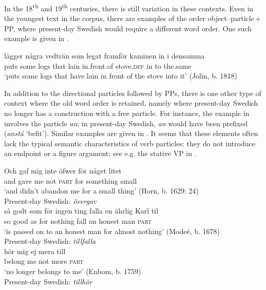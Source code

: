 \documentclass[output=paper]{langscibook}
\begin{document}
\begin{sloppypar}
In the 18\textsuperscript{th} and 19\textsuperscript{th} centuries, there is still variation in these contexts. Even in the youngest text in the corpus, there are examples of the order object–particle\,+\,PP, where present-day Swedish would require a different word order. One such example is given in .
\end{sloppypar}

\ea\label{ex:lalu:44}
\gll  lägger   några   vedträn   som   legat   framför       kaminen in       i     densamma\\
puts       some     logs     that     lain     in.front.of   stove.\textsc{def} in   to   the.same\\
\glt `puts some logs that have lain in front of the stove into it’ (Jolin, b. 1818)\\
\z


In addition to the directional particles followed by PPs, there is one other type of context where the old word order is retained, namely where present-day Swedish no longer has a construction with a free particle. For instance, the example in  involves the particle \textit{an}; in present-day Swedish, \textit{an} would have been prefixed (\textit{anstå} ‘befit’). Similar examples are given in . It seems that these elements often lack the typical semantic characteristics of verb particles: they do not introduce an endpoint or a figure argument; see e.g. the stative VP in .


\ea\label{ex:lalu:45}
\ea\label{ex:lalu:45a}
\gll  Och   gaf   mig     inte     öfwer   för     någet       litet\\
    and     gave  me   not   \textsc{part}     for     something   small\\
\glt `and didn’t abandon me for a small thing’ (Horn, b. 1629: 24)\\
    Present-day Swedish: \textit{övergav}\\

\ex\label{ex:lalu:45b}
\gll  så    godt   som   för   ingen ting   falla   en  ährlig   Karl   til \\
    so     good   as     for   nothing     fall   an  honest   man   \textsc{part}\\
    ‘is passed on to an honest man for almost nothing’ (Modeé, b. 1678)\\
    Present-day Swedish: \textit{tillfalla} \\
\ex\label{ex:lalu:45c}
\gll hör       mig   ej     mera   till \\
    belong   me   not   more   \textsc{part}\\
\glt `no longer belongs to me’ (Enbom, b. 1759)\\
    Present-day Swedish: \textit{tillhör}\\
\z
\z
\end{document}

